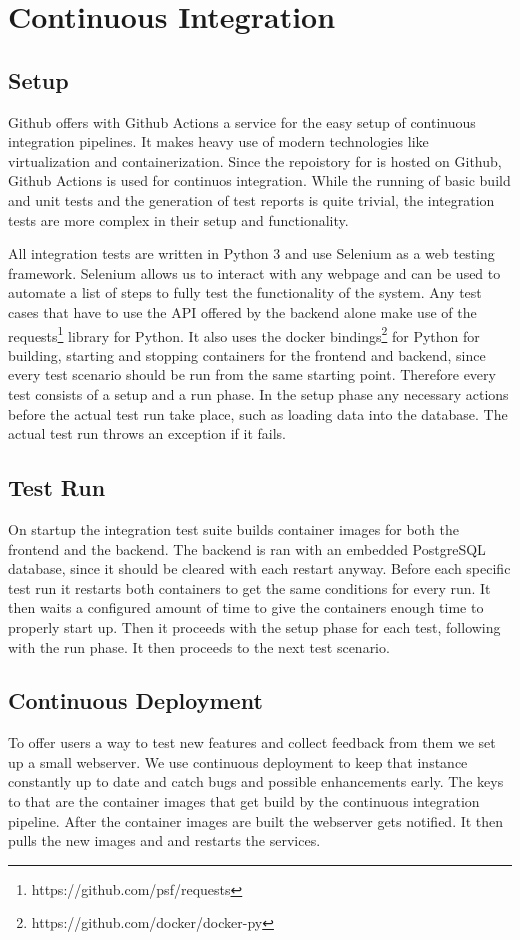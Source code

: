 \section{Continuous Integration}

\subsection{Setup}
Github offers with Github Actions a service for the easy setup of continuous integration pipelines. It makes heavy use of modern technologies like virtualization and containerization. Since the repoistory for \parkview{} is hosted on Github, Github Actions is used for continuos integration. While the running of basic build and unit tests and the generation of test reports is quite trivial, the integration tests are more complex in their setup and functionality.

All integration tests are written in Python 3 and use Selenium as a web testing framework. Selenium allows us to interact with any webpage and can be used to automate a list of steps to fully test the functionality of the system. Any test cases that have to use the API offered by the backend alone make use of the requests\footnote{https://github.com/psf/requests} library for Python. It also uses the docker bindings\footnote{https://github.com/docker/docker-py} for Python for building, starting and stopping containers for the frontend and backend, since every test scenario should be run from the same starting point. Therefore every test consists of a setup and a run phase. In the setup phase any necessary actions before the actual test run take place, such as loading data into the database. The actual test run throws an exception if it fails.

\subsection{Test Run}
On startup the integration test suite builds container images for both the frontend and the backend. The backend is ran with an embedded PostgreSQL database, since it should be cleared with each restart anyway. Before each specific test run it restarts both containers to get the same conditions for every run. It then waits a configured amount of time to give the containers enough time to properly start up. Then it proceeds with the setup phase for each test, following with the run phase. It then proceeds to the next test scenario.

\subsection{Continuous Deployment}
To offer users a way to test new features and collect feedback from them we set up a small webserver. We use continuous deployment to keep that instance constantly up to date and catch bugs and possible enhancements early. The keys to that are the container images that get build by the continuous integration pipeline. After the container images are built the webserver gets notified. It then pulls the new images and and restarts the services.
